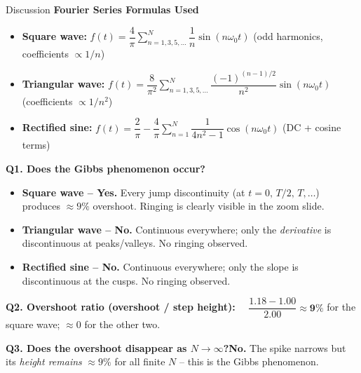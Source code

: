 \documentclass[aspectratio=169,11pt]{beamer}
\begin{document}
\begin{frame}{Discussion}
\textbf{Fourier Series Formulas Used}
\begin{itemize}
  \item \textbf{Square wave:} $f(t)=\dfrac{4}{\pi}\displaystyle\sum_{n=1,3,5,\ldots}^{N}\dfrac{1}{n}\sin(n\omega_0 t)$ \quad (odd harmonics, coefficients $\propto 1/n$)
  \item \textbf{Triangular wave:} $f(t)=\dfrac{8}{\pi^2}\displaystyle\sum_{n=1,3,5,\ldots}^{N}\dfrac{(-1)^{(n-1)/2}}{n^2}\sin(n\omega_0 t)$ \quad (coefficients $\propto 1/n^2$)
  \item \textbf{Rectified sine:} $f(t)=\dfrac{2}{\pi}-\dfrac{4}{\pi}\displaystyle\sum_{n=1}^{N}\dfrac{1}{4n^2-1}\cos(n\omega_0 t)$ \quad (DC + cosine terms)
\end{itemize}

\bigskip
\textbf{Q1. Does the Gibbs phenomenon occur?}
\begin{itemize}
  \item \textbf{Square wave -- Yes.} Every jump discontinuity (at $t=0,\,T/2,\,T,\ldots$) produces $\approx9\%$ overshoot. Ringing is clearly visible in the zoom slide.
  \item \textbf{Triangular wave -- No.} Continuous everywhere; only the \emph{derivative} is discontinuous at peaks/valleys. No ringing observed.
  \item \textbf{Rectified sine -- No.} Continuous everywhere; only the slope is discontinuous at the cusps. No ringing observed.
\end{itemize}

\bigskip
\textbf{Q2. Overshoot ratio (overshoot / step height):}
$\quad\dfrac{1.18-1.00}{2.00}\approx\mathbf{9\%}$ for the square wave; $\approx0$ for the other two.

\bigskip
\textbf{Q3. Does the overshoot disappear as $N\to\infty$?}\quad\textbf{No.}
The spike narrows but its \emph{height remains} $\approx9\%$ for all finite $N$ -- this is the Gibbs phenomenon.
\end{frame}
\end{document}
